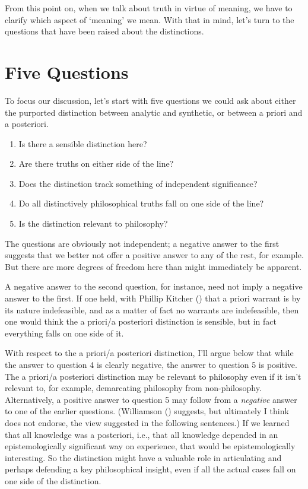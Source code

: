 \documentclass[
  11pt,
  letterpaper,
  DIV=11,
  numbers=noendperiod,
  twoside]{scrartcl}
\providecommand{\tightlist}{%
  \setlength{\itemsep}{0pt}\setlength{\parskip}{0pt}}
\begin{document}
From this point on, when we talk about truth in virtue of meaning, we
have to clarify which aspect of `meaning' we mean. With that in mind,
let's turn to the questions that have been raised about the
distinctions.

\section{Five Questions}\label{fivequestions}

To focus our discussion, let's start with five questions we could ask
about either the purported distinction between analytic and synthetic,
or between a priori and a posteriori.

\begin{enumerate}
\def\labelenumi{\arabic{enumi}.}
\tightlist
\item
  Is there a sensible distinction here?
\item
  Are there truths on either side of the line?
\item
  Does the distinction track something of independent significance?
\item
  Do all distinctively philosophical truths fall on one side of the
  line?
\item
  Is the distinction relevant to philosophy?
\end{enumerate}

The questions are obviously not independent; a negative answer to the
first suggests that we better not offer a positive answer to any of the
rest, for example. But there are more degrees of freedom here than might
immediately be apparent.

A negative answer to the second question, for instance, need not imply a
negative answer to the first. If one held, with Phillip Kitcher
() that a priori warrant is by its
nature indefeasible, and as a matter of fact no warrants are
indefeasible, then one would think the a priori/a posteriori distinction
is sensible, but in fact everything falls on one side of it.

With respect to the a priori/a posteriori distinction, I'll argue below
that while the answer to question 4 is clearly negative, the answer to
question 5 is positive. The a priori/a posteriori distinction may be
relevant to philosophy even if it isn't relevant to, for example,
demarcating philosophy from non-philosophy. Alternatively, a positive
answer to question 5 may follow from a \emph{negative} answer to one of
the earlier questions. (Williamson ()
suggests, but ultimately I think does not endorse, the view suggested in
the following sentences.) If we learned that all knowledge was a
posteriori, i.e., that all knowledge depended in an epistemologically
significant way on experience, that would be epistemologically
interesting. So the distinction might have a valuable role in
articulating and perhaps defending a key philosophical insight, even if
all the actual cases fall on one side of the distinction.
\end{document}
